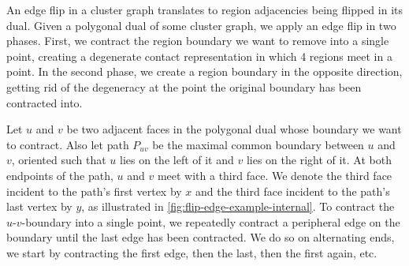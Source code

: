 An edge flip in a cluster graph translates to region adjacencies being flipped in its dual.
Given a polygonal dual of some cluster graph, we apply an edge flip in two phases.
First, we contract the region boundary we want to remove into a single point, creating a degenerate contact representation in which 4 regions meet in a point.
In the second phase, we create a region boundary in the opposite direction, getting rid of the degeneracy at the point the original boundary has been contracted into.


Let $u$ and $v$ be two adjacent faces in the polygonal dual whose boundary we want to contract.
Also let path $P_{uv}$ be the maximal common boundary between $u$ and $v$, oriented such that $u$ lies on the left of it and $v$ lies on the right of it.
At both endpoints of the path, $u$ and $v$ meet with a third face.
We denote the third face incident to the path's first vertex by $x$ and the third face incident to the path's last vertex by $y$, as illustrated in \cref{fig:flip-edge-example-internal}.
To contract the $u$-$v$-boundary into a single point, we repeatedly contract a peripheral edge on the boundary until the last edge has been contracted.
We do so on alternating ends, \ie{} we start by contracting the first edge, then the last, then the first again, etc.

